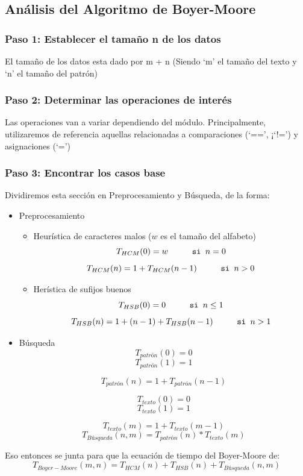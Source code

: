 \subsection*{Análisis del Algoritmo de Boyer-Moore}

\subsubsection*{Paso 1: Establecer el tamaño n de los datos}
El tamaño de los datos esta dado por m + n (Siendo ‘m’ el tamaño del texto y ‘n’ el tamaño del patrón)

\subsubsection*{Paso 2: Determinar las operaciones de interés}
Las operaciones van a variar dependiendo del módulo. Principalmente, utilizaremos de referencia aquellas relacionadas a comparaciones (‘==’, ¡‘!=’) y asignaciones (‘=’)

\subsubsection*{Paso 3: Encontrar los casos base}
Dividiremos esta sección en Preprocesamiento y Búsqueda, de la forma:
\begin{itemize}
    \item Preprocesamiento
    \begin{itemize}
        \item Heurística de caracteres malos ($w$ es el tamaño del alfabeto)
        \[T_{HCM}(0) = w \hskip1cm \texttt{si } n = 0\]
        \[T_{HCM}(n) = 1 + T_{HCM}(n-1) \hskip1cm \texttt{si } n > 0\]
        \item Herística de sufijos buenos
        \[T_{HSB}(0) = 0 \hskip1cm \texttt{si } n \leq 1\]
        \[T_{HSB}(n) = 1 + (n-1) + T_{HSB}(n-1) \hskip1cm \texttt{si } n > 1\]
    \end{itemize}
    \item Búsqueda
    \[T_{patrón}(0) =  0\]
    \[T_{patrón}(1) = 1\]

    \[T_{patrón}(n) = 1 + T_{patrón}(n-1)\]

    \[T_{texto}(0) =  0\]
    \[T_{texto}(1) = 1\]

    \[T_{texto}(m) = 1 + T_{texto}(m-1)\]
    \[T_{Búsqueda}(n,m) = T_{patrón}(n) * T_{texto}(m)\]
\end{itemize}
Eso entonces se junta para que la ecuación de tiempo del Boyer-Moore de:
\[T_{Boyer-Moore}(m,n) = T_{HCM}(n) + T_{HSB}(n) + T_{Búsqueda}(n,m)\]


